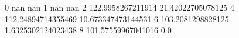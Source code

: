 0 nan nan
1 nan nan
2 122.9958267211914 21.42022705078125
4 112.24894714355469 10.673347473144531
6 103.2081298828125 1.6325302124023438
8 101.57559967041016 0.0
